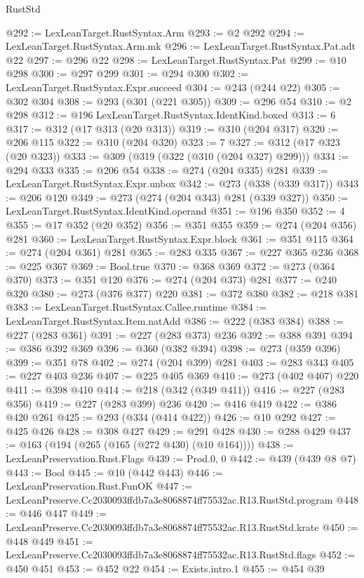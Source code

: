 \begin{lexlean}{RustStd}
\begin{coremodule}
@292 := LexLeanTarget.RustSyntax.Arm
@293 := @2 @292
@294 := LexLeanTarget.RustSyntax.Arm.mk
@296 := LexLeanTarget.RustSyntax.Pat.adt @22
@297 := @296 @22
@298 := LexLeanTarget.RustSyntax.Pat
@299 := @10 @298
@300 := @297 @299
@301 := @294 @300
@302 := LexLeanTarget.RustSyntax.Expr.succeed
@304 := @243 (@244 @22)
@305 := @302 @304
@308 := @293 (@301 (@221 @305))
@309 := @296 @54
@310 := @2 @298
@312 := @196 LexLeanTarget.RustSyntax.IdentKind.boxed
@313 := 6
@317 := @312 (@17 @313 (@20 @313))
@319 := @310 (@204 @317)
@320 := @206 @115
@322 := @310 (@204 @320)
@323 := 7
@327 := @312 (@17 @323 (@20 @323))
@333 := @309 (@319 (@322 (@310 (@204 @327) @299)))
@334 := @294 @333
@335 := @206 @54
@338 := @274 (@204 @335) @281
@339 := LexLeanTarget.RustSyntax.Expr.unbox
@342 := @273 (@338 (@339 @317))
@343 := @206 @120
@349 := @273 (@274 (@204 @343) @281 (@339 @327))
@350 := LexLeanTarget.RustSyntax.IdentKind.operand
@351 := @196 @350
@352 := 4
@355 := @17 @352 (@20 @352)
@356 := @351 @355
@359 := @274 (@204 @356) @281
@360 := LexLeanTarget.RustSyntax.Expr.block
@361 := @351 @115
@364 := @274 (@204 @361) @281
@365 := @283 @335
@367 := @227 @365 @236
@368 := @225 @367
@369 := Bool.true
@370 := @368 @369
@372 := @273 (@364 @370)
@373 := @351 @120
@376 := @274 (@204 @373) @281
@377 := @240 @320
@380 := @273 (@376 @377) @220
@381 := @372 @380
@382 := @218 @381
@383 := LexLeanTarget.RustSyntax.Callee.runtime
@384 := LexLeanTarget.RustSyntax.Item.natAdd
@386 := @222 (@383 @384)
@388 := @227 (@283 @361)
@391 := @227 (@283 @373) @236
@392 := @388 @391
@394 := @386 @392 @369
@396 := @360 (@382 @394)
@398 := @273 (@359 @396)
@399 := @351 @78
@402 := @274 (@204 @399) @281
@403 := @283 @343
@405 := @227 @403 @236
@407 := @225 @405 @369
@410 := @273 (@402 @407) @220
@411 := @398 @410
@414 := @218 (@342 (@349 @411))
@416 := @227 (@283 @356)
@419 := @227 (@283 @399) @236
@420 := @416 @419
@422 := @386 @420 @261
@425 := @293 (@334 (@414 @422))
@426 := @10 @292
@427 := @425 @426
@428 := @308 @427
@429 := @291 @428
@430 := @288 @429
@437 := @163 (@194 (@265 (@165 (@272 @430) (@10 @164))))
@438 := LexLeanPreservation.Rust.Flags
@439 := Prod.{0, 0}
@442 := @439 (@439 @8 @7)
@443 := Bool
@445 := @10 (@442 @443)
@446 := LexLeanPreservation.Rust.FunOK
@447 := LexLeanPreserve.Cc2030093ffdb7a3e8068874ff75532ac.R13.RustStd.program
@448 := @446 @447
@449 := LexLeanPreserve.Cc2030093ffdb7a3e8068874ff75532ac.R13.RustStd.krate
@450 := @448 @449
@451 := LexLeanPreserve.Cc2030093ffdb7a3e8068874ff75532ac.R13.RustStd.flags
@452 := @450 @451
@453 := @452 @22
@454 := Exists.intro.{1}
@455 := @454 @39

\end{coremodule}
\end{lexlean}
